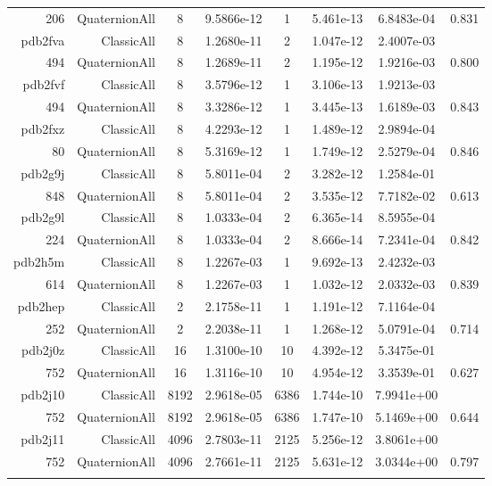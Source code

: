 \begin{xltabular}{\textwidth}{r|rcS[table-format=1.4e+2]cS[table-format=1.3e+2]S[table-format=1.4e+2]S[table-format=-1.3]}
206 & QuaternionAll & 8 & 9.5866e-12 & 1 & 5.461e-13 & 6.8483e-04 & 0.831\\  \addlinespace
pdb2fva & ClassicAll & 8 & 1.2680e-11 & 2 & 1.047e-12 & 2.4007e-03 & \\
494 & QuaternionAll & 8 & 1.2689e-11 & 2 & 1.195e-12 & 1.9216e-03 & 0.800\\  \addlinespace
pdb2fvf & ClassicAll & 8 & 3.5796e-12 & 1 & 3.106e-13 & 1.9213e-03 & \\
494 & QuaternionAll & 8 & 3.3286e-12 & 1 & 3.445e-13 & 1.6189e-03 & 0.843\\  \addlinespace
pdb2fxz & ClassicAll & 8 & 4.2293e-12 & 1 & 1.489e-12 & 2.9894e-04 & \\
80 & QuaternionAll & 8 & 5.3169e-12 & 1 & 1.749e-12 & 2.5279e-04 & 0.846\\  \addlinespace
pdb2g9j & ClassicAll & 8 & 5.8011e-04 & 2 & 3.282e-12 & 1.2584e-01 & \\
848 & QuaternionAll & 8 & 5.8011e-04 & 2 & 3.535e-12 & 7.7182e-02 & 0.613\\  \addlinespace
pdb2g9l & ClassicAll & 8 & 1.0333e-04 & 2 & 6.365e-14 & 8.5955e-04 & \\
224 & QuaternionAll & 8 & 1.0333e-04 & 2 & 8.666e-14 & 7.2341e-04 & 0.842\\  \addlinespace
pdb2h5m & ClassicAll & 8 & 1.2267e-03 & 1 & 9.692e-13 & 2.4232e-03 & \\
614 & QuaternionAll & 8 & 1.2267e-03 & 1 & 1.032e-12 & 2.0332e-03 & 0.839\\  \addlinespace
pdb2hep & ClassicAll & 2 & 2.1758e-11 & 1 & 1.191e-12 & 7.1164e-04 & \\
252 & QuaternionAll & 2 & 2.2038e-11 & 1 & 1.268e-12 & 5.0791e-04 & 0.714\\  \addlinespace
pdb2j0z & ClassicAll & 16 & 1.3100e-10 & 10 & 4.392e-12 & 5.3475e-01 & \\
752 & QuaternionAll & 16 & 1.3116e-10 & 10 & 4.954e-12 & 3.3539e-01 & 0.627\\  \addlinespace
{\color{red} pdb2j10 } & ClassicAll & 8192 & 2.9618e-05 & 6386 & 1.744e-10 & 7.9941e+00 & \\
752 & QuaternionAll & 8192 & 2.9618e-05 & 6386 & 1.747e-10 & 5.1469e+00 & 0.644\\  \addlinespace
{\color{red} pdb2j11 } & ClassicAll & 4096 & 2.7803e-11 & 2125 & 5.256e-12 & 3.8061e+00 & \\
752 & QuaternionAll & 4096 & 2.7661e-11 & 2125 & 5.631e-12 & 3.0344e+00 & 0.797\\  \addlinespace

\end{xltabular}

